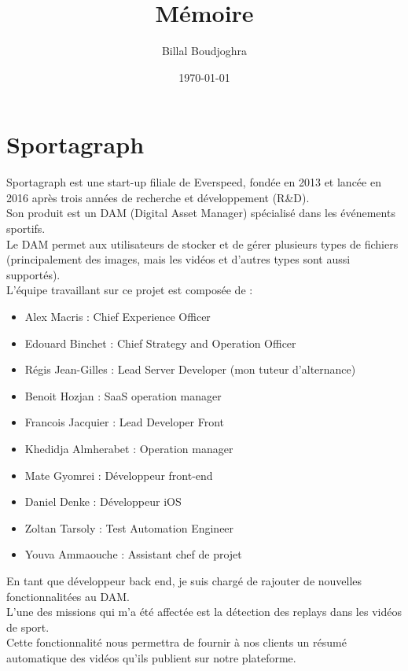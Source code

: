 \documentclass[11pt]{article}
\author{Billal Boudjoghra}
\date{\today}
\title{Mémoire}
\begin{document}
\maketitle
\tableofcontents

\newpage
\section{Sportagraph}
\label{sec:orgd6bb7b7}
Sportagraph est une start-up filiale de Everspeed, fondée en 2013 et lancée en 2016 après trois années de recherche et développement (R\&D).\\
Son produit est un DAM (Digital Asset Manager) spécialisé dans les événements sportifs.\\

Le DAM permet aux utilisateurs de stocker et de gérer plusieurs types de fichiers (principalement des images, mais les vidéos et d’autres types sont aussi supportés).\\
L’équipe travaillant sur ce projet est composée de :\\
\begin{itemize}
\item Alex Macris : Chief Experience Officer\\
\item Edouard Binchet : Chief Strategy and Operation Officer\\
\item Régis Jean-Gilles : Lead Server Developer (mon tuteur d'alternance)\\
\item Benoit Hozjan : SaaS operation manager\\
\item Francois Jacquier : Lead Developer Front\\
\item Khedidja Almherabet : Operation manager\\
\item Mate Gyomrei : Développeur front-end\\
\item Daniel Denke : Développeur iOS\\
\item Zoltan Tarsoly : Test Automation Engineer\\
\item Youva Ammaouche : Assistant chef de projet\\
\end{itemize}

En tant que développeur back end, je suis chargé de rajouter de nouvelles fonctionnalitées au DAM.\\
L'une des missions qui m'a été affectée est la détection des replays dans les vidéos de sport.\\
Cette fonctionnalité nous permettra de fournir à nos clients un résumé automatique des vidéos qu'ils publient sur notre plateforme.\\
\end{document}
